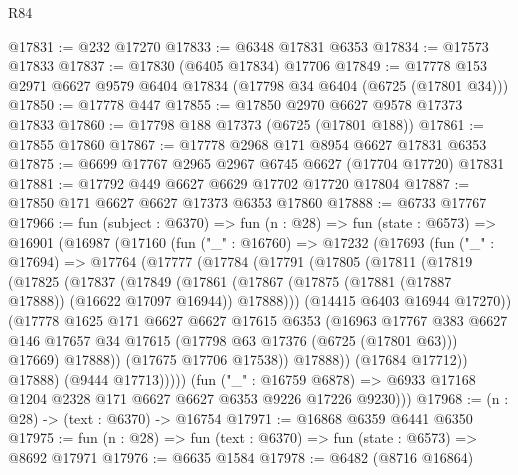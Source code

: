 \begin{lexlean}{R84}
\begin{coremodule}
@17831 := @232 @17270
@17833 := @6348 @17831 @6353
@17834 := @17573 @17833
@17837 := @17830 (@6405 @17834) @17706
@17849 := @17778 @153 @2971 @6627 @9579 @6404 @17834 (@17798 @34 @6404 (@6725 (@17801 @34)))
@17850 := @17778 @447
@17855 := @17850 @2970 @6627 @9578 @17373 @17833
@17860 := @17798 @188 @17373 (@6725 (@17801 @188))
@17861 := @17855 @17860
@17867 := @17778 @2968 @171 @8954 @6627 @17831 @6353
@17875 := @6699 @17767 @2965 @2967 @6745 @6627 (@17704 @17720) @17831
@17881 := @17792 @449 @6627 @6629 @17702 @17720 @17804
@17887 := @17850 @171 @6627 @6627 @17373 @6353 @17860
@17888 := @6733 @17767
@17966 := fun (subject : @6370) =>
  fun (n : @28) =>
  fun (state : @6573) =>
  @16901
    (@16987
      (@17160
        (fun ("_" : @16760) =>
        @17232
          (@17693
            (fun ("_" : @17694) =>
            @17764
              (@17777
                (@17784
                  (@17791
                    (@17805
                      (@17811
                        (@17819
                          (@17825
                            (@17837
                              (@17849
                                (@17861
                                  (@17867
                                    (@17875 (@17881 (@17887 @17888)) (@16622 @17097 @16944))
                                    @17888)))
                              (@14415 @6403 @16944 @17270))
                            (@17778
                              @1625
                              @171
                              @6627
                              @6627
                              @17615
                              @6353
                              (@16963
                                @17767
                                @383
                                @6627
                                @146
                                @17657
                                @34
                                @17615
                                (@17798 @63 @17376 (@6725 (@17801 @63)))
                                @17669)
                              @17888))
                          (@17675 @17706 @17538))
                        @17888))
                    (@17684 @17712))
                  @17888)
                (@9444 @17713)))))
        (fun ("_" : @16759 @6878) =>
        @6933 @17168 @1204 @2328 @171 @6627 @6627 @6353 @9226 @17226 @9230)))
@17968 := (n : @28) -> (text : @6370) -> @16754
@17971 := @16868 @6359 @6441 @6350
@17975 := fun (n : @28) => fun (text : @6370) => fun (state : @6573) => @8692 @17971
@17976 := @6635 @1584
@17978 := @6482 (@8716 @16864)

\end{coremodule}
\end{lexlean}
